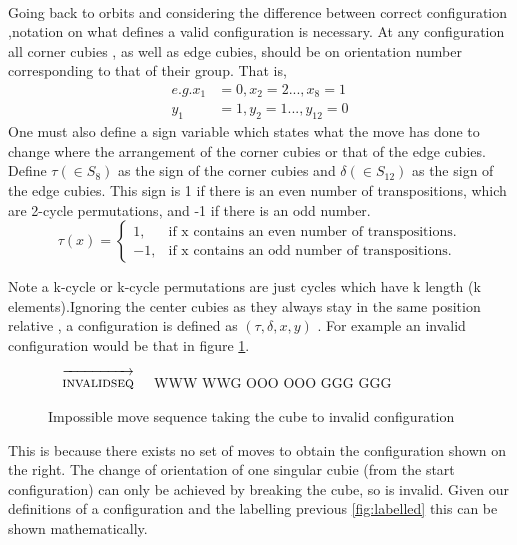 \documentclass{article}
\newcounter{lem}[section]\setcounter{lem}{0}
\begin{document}
\paragraph*{}
Going back to orbits and considering the difference between correct configuration ,notation on what defines a valid configuration is necessary. At any configuration all corner cubies , as well as edge cubies, should be on orientation number corresponding to that of their group. That is,
\begin{align*}
e.g. x_1&=0, x_2=2 ...,x_8=1\\
y_1&=1, y_2=1 ... , y_{12}=0
\end{align*}
One must also define a sign variable which states what the move has done to change where the arrangement of the corner cubies or that of the edge cubies. 
Define $\tau (\in S_{8})$ as the sign of the corner cubies and $\delta (\in  S_{12})$ as the sign of the edge cubies. This sign is 1 if there is an even number of transpositions, which are 2-cycle permutations, and -1 if there is an odd number. 
\begin{equation}
  \tau(x)=\begin{cases}
    1, & \text{if x contains an even number of transpositions}.\\
    -1, & \text{if x contains an odd number of transpositions}.
  \end{cases}
\end{equation}

Note a k-cycle or k-cycle permutations are just cycles which have k length (k elements).\newline Ignoring the center cubies as they always stay in the same position relative , a configuration is defined as \textbf{$(\tau,\delta, x, y)$ }.
For example an invalid configuration would be that in figure \ref{fig:invalid}.

\newcommand{\invalidseq}{[invalidseq],F2,F2}%
\newcommand{\invalidseqarrow}{$\quad\overrightarrow{\strut\textsc{invalidseq}}\quad$}

\begin{figure}
\centering
  \RubikCubeSolved%
  \invalidseqarrow
  \RubikRotation{\invalidseq}
   {W}{W}{W} {W}{W}{G}%
   {O}{O}{O} {O}{O}{O}%
   {G}{G}{G} {G}{G}{G}%
\caption{Impossible move sequence taking the cube to invalid configuration}
\label{fig:invalid}
\end{figure}
\vspace{20pt}
This is because there exists no set of moves to obtain the configuration shown on the right. The change of orientation of one singular cubie (from the start configuration) can only be achieved by breaking the cube, so is invalid. Given our definitions of a configuration and the labelling previous \ref{fig:labelled} this can be shown mathematically. 
\end{document}
